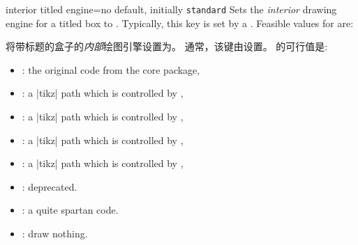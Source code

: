 \begin{docTcbKey}{interior titled engine}{=}{no default, initially \texttt{standard}}
Sets the \emph{interior} drawing engine for a titled box to .
Typically, this key is set by a .
Feasible values for  are:

将带标题的盒子的\emph{内部}绘图引擎设置为。%
通常，该键由设置。
的可行值是:

  \begin{itemize}
  \item{}: the original code from the core package,
  \item{}: a |tikz| path which is controlled by ,
  \item{}: a |tikz| path which is controlled by ,
  \item{}: a |tikz| path which is controlled by ,
  \item{}: a |tikz| path which is controlled by ,
  \item{}: deprecated.
  \item{}: a quite spartan code.
  \item{}: draw nothing.
  \end{itemize}
\end{docTcbKey}


